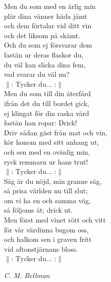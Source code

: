 \documentclass[a6paper,10pt]{article}
\newcommand{\notis}[1]{\begin{flushright}\textit{#1}\end{flushright}}
\begin{document}
\newpage
\setlength{\oddsidemargin}{-0.37in}
\noindent
Men du som med en ärlig min\\
plär dina vänner häda jämt\\
och dem förtalar vid ditt vin\\
och det liksom på skämt.\\
Och du som ej försvarar dem\\
fastän ur deras flaskor du,\\
du väl kan slicka dina fem,\\
vad svarar du väl nu?
\vspace{5pt}\\
$\|$: Tycker du... :$\|$
\vspace{5pt}\\
Men du som till din återfärd\\
ifrån det du till bordet gick,\\
ej klingat för din raska värd\\
fastän han ropar: Drick!\\
Driv sådan gäst från mat och vin,\\
kör honom med sitt anhang ut,\\
och sen med en ovänlig min,\\
ryck remmarn ur hans trut!
\vspace{5pt}\\
$\|$: Tycker du... :$\|$
\vspace{5pt}\\
Säg är du nöjd, min granne säg,\\
så prisa världen nu till slut;\\
om vi ha en och samma väg,\\
så följoms åt; drick ut.\\
Men först med vinet rött och vitt\\
för vår värdinna bugom oss,\\
och halkom sen i graven fritt\\
vid aftonstjärnans bloss.
\vspace{5pt}\\
$\|$: Tycker du... :$\|$
\notis{C. M. Bellman}
\end{document}
